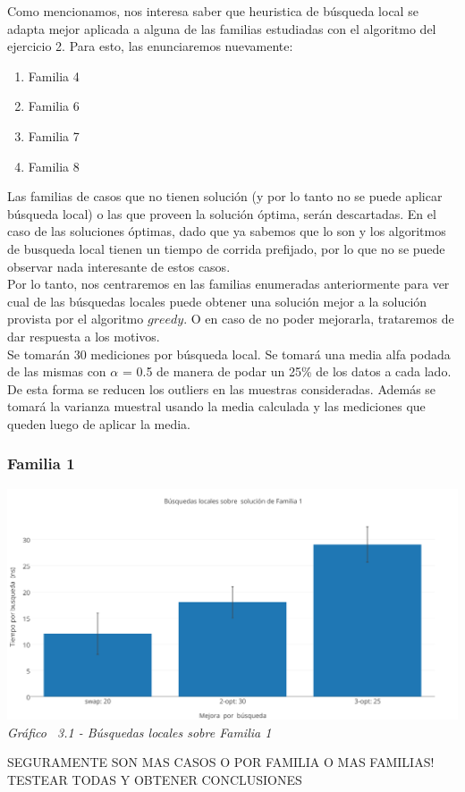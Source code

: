 Como mencionamos, nos interesa saber que heuristica de búsqueda local se adapta mejor aplicada a alguna de las familias estudiadas con el algoritmo del ejercicio 2. Para esto, las enunciaremos nuevamente:

\begin{enumerate}
\item Familia 4
\item Familia 6
\item Familia 7
\item Familia 8
\end{enumerate}

Las familias de casos que no tienen solución (y por lo tanto no se puede aplicar búsqueda local) o las que proveen la solución óptima, serán descartadas. En el caso de las soluciones óptimas, dado que ya sabemos que lo son y los algoritmos de busqueda local tienen un tiempo de corrida prefijado, por lo que no se puede observar nada interesante de estos casos.\\
Por lo tanto, nos centraremos en las familias enumeradas anteriormente para ver cual de las búsquedas locales puede obtener una solución mejor a la solución provista por el algoritmo $greedy$. O en caso de no poder mejorarla, trataremos de dar respuesta a los motivos.\\

Se tomarán 30 mediciones por búsqueda local. Se tomará una media alfa podada de las mismas con $\alpha$ = 0.5 de manera de podar un 25\% de los datos a cada lado. De esta forma se reducen los outliers en las muestras consideradas. 
Además se tomará la varianza muestral usando la media calculada y las mediciones que queden luego de aplicar la media.\\

\subsubsection*{Familia 1}

\vspace*{0.3cm} \vspace*{0.3cm}
  \begin{center}
 \includegraphics[scale=0.5]{./EJ3/local_search_familia.png}
 {            \textit{Gráfico \ 3.1 - Búsquedas locales sobre Familia 1}}
  \end{center}
  \vspace*{0.3cm}
  
SEGURAMENTE SON MAS CASOS O POR FAMILIA O MAS FAMILIAS! TESTEAR TODAS Y OBTENER CONCLUSIONES
